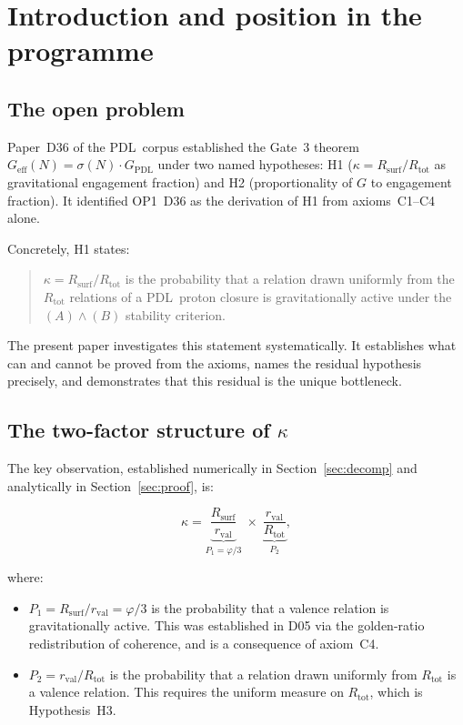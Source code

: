 \documentclass[11pt,a4paper]{article}
\theoremstyle{definition}
\newcommand{\PDL}{\textnormal{PDL}}
\newcommand{\rval}{r_{\mathrm{val}}}
\newcommand{\Rtot}{R_{\mathrm{tot}}}
\newcommand{\Rsurf}{R_{\mathrm{surf}}}
\newcommand{\vp}{\varphi}
\newcommand{\kap}{\kappa}
\newcommand{\sig}{\sigma}
\newcommand{\GPDL}{G_{\mathrm{PDL}}}
\newcommand{\Geff}{G_{\mathrm{eff}}}
\begin{document}
\newpage

\tableofcontents
\newpage

\section{Introduction and position in the programme}
\label{sec:intro}

\subsection{The open problem}

Paper~D36 of the \PDL\ corpus established the Gate~3 theorem
$\Geff(N) = \sig(N)\cdot\GPDL$ under two named hypotheses: H1
($\kap = \Rsurf/\Rtot$ as gravitational engagement fraction) and H2
(proportionality of $G$ to engagement fraction). It identified OP1~D36
as the derivation of H1 from axioms~C1--C4 alone.

Concretely, H1 states:
\begin{quote}
$\kap = \Rsurf/\Rtot$ is the probability that a relation drawn uniformly
from the $\Rtot$ relations of a \PDL\ proton closure is gravitationally
active under the $(A)\wedge(B)$ stability criterion.
\end{quote}

The present paper investigates this statement systematically. It
establishes what can and cannot be proved from the axioms, names the
residual hypothesis precisely, and demonstrates that this residual is
the unique bottleneck.

\subsection{The two-factor structure of \texorpdfstring{$\kap$}{kappa}}

The key observation, established numerically in Section~\ref{sec:decomp}
and analytically in Section~\ref{sec:proof}, is:

\begin{equation}
\kap = \underbrace{\frac{\Rsurf}{\rval}}_{P_1 = \vp/3}
\;\times\;
\underbrace{\frac{\rval}{\Rtot}}_{P_2},
\label{eq:decomp_intro}
\end{equation}

where:
\begin{itemize}
\item $P_1 = \Rsurf/\rval = \vp/3$ is the probability that a valence
  relation is gravitationally active. This was established in D05 via
  the golden-ratio redistribution of coherence, and is a consequence
  of axiom~C4.
\item $P_2 = \rval/\Rtot$ is the probability that a relation drawn
  uniformly from $\Rtot$ is a valence relation. This requires the
  uniform measure on $\Rtot$, which is Hypothesis~H3.
\end{itemize}
\end{document}
